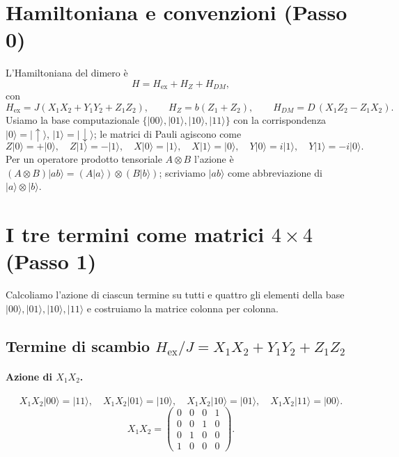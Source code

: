 \documentclass[11pt,a4paper]{article}
\newcommand{\ket}[1]{\lvert #1 \rangle}
\newcommand{\up}{\uparrow}
\newcommand{\dn}{\downarrow}
\theoremstyle{definition}
\begin{document}
\section{Hamiltoniana e convenzioni (Passo 0)}

L'Hamiltoniana del dimero è
\begin{equation}
H = H_{\mathrm{ex}} + H_Z + H_{DM},
\label{eq:Htot}
\end{equation}
con
\[
H_{\mathrm{ex}}=J(X_1X_2+Y_1Y_2+Z_1Z_2),\qquad
H_Z=b(Z_1+Z_2),\qquad
H_{DM}=D\,(X_1Z_2-Z_1X_2).
\]
Usiamo la base computazionale $\{\ket{00},\ket{01},\ket{10},\ket{11}\}$ con la corrispondenza
$\ket{0}=\ket{\up}$, $\ket{1}=\ket{\dn}$; le matrici di Pauli agiscono come
\[
Z\ket{0}=+\ket{0},\quad Z\ket{1}=-\ket{1},\quad
X\ket{0}=\ket{1},\quad X\ket{1}=\ket{0},\quad
Y\ket{0}=i\ket{1},\quad Y\ket{1}=-i\ket{0}.
\]
Per un operatore prodotto tensoriale $A\otimes B$ l'azione è
$(A\otimes B)\ket{ab}=(A\ket{a})\otimes(B\ket{b})$; scriviamo $\ket{ab}$ come abbreviazione di
$\ket{a}\otimes\ket{b}$.

\section{I tre termini come matrici $4\times4$ (Passo 1)}

Calcoliamo l'azione di ciascun termine su tutti e quattro gli elementi della base
$\ket{00},\ket{01},\ket{10},\ket{11}$ e costruiamo la matrice colonna per colonna.

\subsection{Termine di scambio $H_{\mathrm{ex}}/J = X_1X_2+Y_1Y_2+Z_1Z_2$}

\paragraph{Azione di $X_1X_2$.}
\[
X_1X_2\ket{00}=\ket{11},\quad
X_1X_2\ket{01}=\ket{10},\quad
X_1X_2\ket{10}=\ket{01},\quad
X_1X_2\ket{11}=\ket{00}.
\]
\[
X_1X_2=\begin{pmatrix}0&0&0&1\\0&0&1&0\\0&1&0&0\\1&0&0&0\end{pmatrix}.
\]
\end{document}
